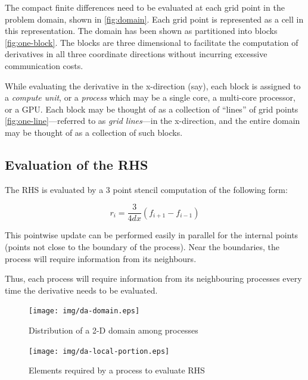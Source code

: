 \documentclass{article}
\begin{document}
    The compact finite differences need to be evaluated
    at each grid point in the problem domain,
    shown in \ref{fig:domain}.
    Each grid point is represented as a cell in this representation.
    The domain has been shown as partitioned into blocks \ref{fig:one-block}.
    The blocks are three dimensional to facilitate
    the computation of derivatives in all three coordinate directions
    without incurring excessive communication costs.

    While evaluating the derivative in the x-direction (say),
    each block is assigned to a \emph{compute unit}, or a \emph{process}
    which may be a single core, a multi-core processor, or a GPU.
    Each block may be thought of as a collection of ``lines'' of grid points
    \ref{fig:one-line}---referred to as \emph{grid lines}---in the x-direction,
    and the entire domain may be thought of as a collection of such blocks.

    \subsection{Evaluation of the RHS}

        The RHS is evaluated by a 3 point stencil computation of
        the following form:

        \begin{equation*}
            r_i = \frac{3}{4dx} (f_{i+1} - f_{i-1})
        \end{equation*}

        This pointwise update can be performed easily in parallel
        for the internal points (points not close to the boundary of the process).
        Near the boundaries, the process will require information from its
        neighbours.

        Thus, each process will require information from its
        neighbouring processes every time the derivative needs to be evaluated.

        \begin{figure}[h]
        \begin{center}
        \texttt{[image: img/da-domain.eps]}
        \end{center}
        \caption{Distribution of a 2-D domain among processes}
        \label{fig:da-domain}
        \end{figure}

        \begin{figure}[h]
        \begin{center}
        \texttt{[image: img/da-local-portion.eps]}
        \end{center}
        \caption{Elements required by a process to evaluate RHS}
        \label{fig:da-local-portion}
        \end{figure}
\end{document}

